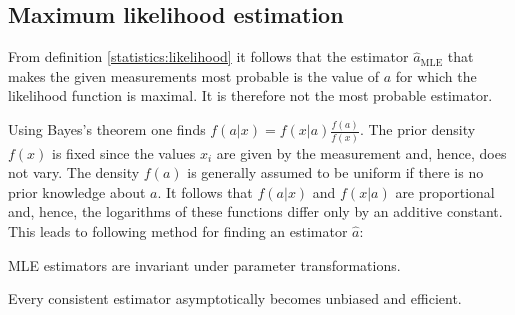 {    

\subsection{Maximum likelihood estimation}

    From definition \ref{statistics:likelihood} it follows that the estimator $\hat{a}_\mathrm{MLE}$ that makes the given measurements most probable is the value of $a$ for which the likelihood function is maximal. It is therefore not the most probable estimator.

    Using Bayes's theorem one finds $f(a|x) = f(x|a)\frac{f(a)}{f(x)}$. The prior density $f(x)$ is fixed since the values $x_i$ are given by the measurement and, hence, does not vary. The density $f(a)$ is generally assumed to be uniform if there is no prior knowledge about $a$. It follows that $f(a|x)$ and $f(x|a)$ are proportional and, hence, the logarithms of these functions differ only by an additive constant. This leads to following method for finding an estimator $\hat{a}$:
    \begin{property}
        MLE estimators are invariant under parameter transformations.
    \end{property}

    \begin{property}
        Every consistent estimator asymptotically becomes unbiased and efficient.
    \end{property}

}
